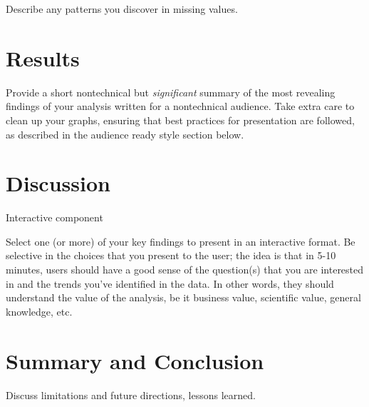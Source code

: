 \documentclass[]{book}
\begin{document}
Describe any patterns you discover in missing values.

\hypertarget{results}{%
\chapter{Results}\label{results}}

Provide a short nontechnical but \emph{significant} summary of the most revealing findings of your analysis written for a nontechnical audience. Take extra care to clean up your graphs, ensuring that best practices for presentation are followed, as described in the audience ready style section below.

\hypertarget{discussion}{%
\chapter{Discussion}\label{discussion}}

Interactive component

Select one (or more) of your key findings to present in an interactive format. Be selective in the choices that you present to the user; the idea is that in 5-10 minutes, users should have a good sense of the question(s) that you are interested in and the trends you've identified in the data. In other words, they should understand the value of the analysis, be it business value, scientific value, general knowledge, etc.

\hypertarget{summary-and-conclusion}{%
\chapter{Summary and Conclusion}\label{summary-and-conclusion}}

Discuss limitations and future directions, lessons learned.


\end{document}
